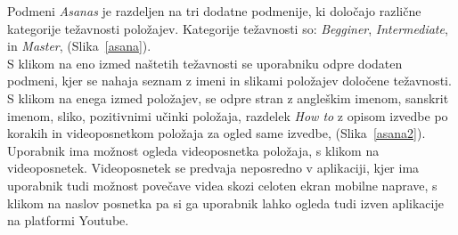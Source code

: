 \documentclass[a4paper, 12pt]{book}
\begin{document}
Podmeni \textit{Asanas} je razdeljen na tri dodatne podmenije, ki določajo različne kategorije težavnosti položajev. Kategorije težavnosti so: \textit{Begginer}, \textit{Intermediate}, in \textit{Master}, (Slika~\ref{asana}). \\
S klikom na eno izmed naštetih težavnosti se uporabniku odpre dodaten podmeni, kjer se nahaja seznam z imeni in slikami položajev določene težavnosti. S klikom na enega izmed položajev, se odpre stran z angleškim imenom, sanskrit imenom, sliko, pozitivnimi učinki položaja, razdelek \textit{How to} z opisom izvedbe po korakih in videoposnetkom položaja za ogled same izvedbe, (Slika~\ref{asana2}). Uporabnik ima možnost ogleda videoposnetka položaja, s klikom na videoposnetek. Videoposnetek se predvaja neposredno v aplikaciji, kjer ima uporabnik tudi možnost povečave videa skozi celoten ekran mobilne naprave, s klikom na naslov posnetka pa si ga uporabnik lahko ogleda tudi izven aplikacije na platformi Youtube.\\
\end{document}
